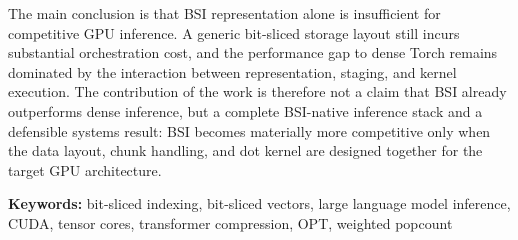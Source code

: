The main conclusion is that BSI representation alone is insufficient for competitive GPU inference. A generic bit-sliced storage layout still incurs substantial orchestration cost, and the performance gap to dense Torch remains dominated by the interaction between representation, staging, and kernel execution. The contribution of the work is therefore not a claim that BSI already outperforms dense inference, but a complete BSI-native inference stack and a defensible systems result: BSI becomes materially more competitive only when the data layout, chunk handling, and dot kernel are designed together for the target GPU architecture.

\noindent\textbf{Keywords:} bit-sliced indexing, bit-sliced vectors, large language model inference, CUDA, tensor cores, transformer compression, OPT, weighted popcount
